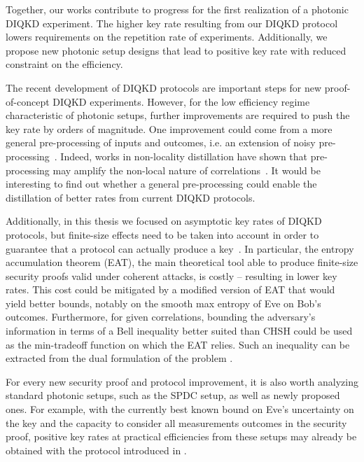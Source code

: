 Together, our works contribute to progress for the first realization of a photonic DIQKD experiment.
The higher key rate resulting from our DIQKD protocol lowers requirements on the repetition rate of experiments.
Additionally, we propose new photonic setup designs that lead to positive key rate with reduced constraint on the efficiency.

\medbreak

The recent development of DIQKD protocols are important steps for new proof-of-concept DIQKD experiments.
However, for the low efficiency regime characteristic of photonic setups, further improvements are required to push the key rate by orders of magnitude.
One improvement could come from a more general pre-processing of inputs and outcomes, i.e. an extension of noisy pre-processing~\cite{Ho2020}.
Indeed, works in non-locality distillation have shown that pre-processing may amplify the non-local nature of correlations~\cite{Forster2009}.
It would be interesting to find out whether a general pre-processing could enable the distillation of better rates from current DIQKD protocols.

Additionally, in this thesis we focused on asymptotic key rates of DIQKD protocols, but finite-size effects need to be taken into account in order to guarantee that a protocol can actually produce a key~\cite{Tan2021}.
In particular, the entropy accumulation theorem (EAT), the main theoretical tool able to produce finite-size security proofs valid under coherent attacks, is costly -- resulting in lower key rates.
This cost could be mitigated by a modified version of EAT that would yield better bounds, notably on the smooth max entropy of Eve on Bob's outcomes.
Furthermore, for given correlations, bounding the adversary's information in terms of a Bell inequality better suited than CHSH could be used as the min-tradeoff function on which the EAT relies.
Such an inequality can be extracted from the dual formulation of the problem .

\medbreak

For every new security proof and protocol improvement, it is also worth analyzing standard photonic setups, such as the SPDC setup, as well as newly proposed ones.
For example, with the currently best known bound on Eve's uncertainty on the key and the capacity to consider all measurements outcomes in the security proof, positive key rates at practical efficiencies from these setups may already be obtained with the protocol introduced in \cite{Brown2021}.

